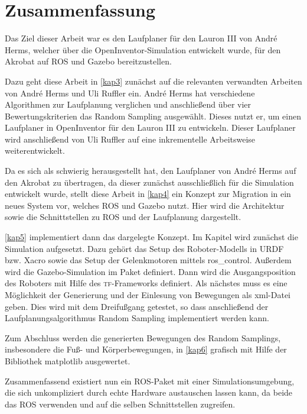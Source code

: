 \chapter{Zusammenfassung}
\label{kap7}

Das Ziel dieser Arbeit war es den Laufplaner für den Lauron III von André Herms, welcher über die OpenInventor-Simulation entwickelt wurde, für den Akrobat auf \ac{ROS} und Gazebo bereitzustellen.

Dazu geht diese Arbeit in \autoref{kap3} zunächst auf die relevanten verwandten Arbeiten von André Herms und Uli Ruffler ein. André Herms hat verschiedene Algorithmen zur Laufplanung verglichen und anschließend über vier Bewertungskriterien das Random Sampling ausgewählt. Dieses nutzt er, um einen Laufplaner in OpenInventor für den Lauron III zu entwickeln. Dieser Laufplaner wird anschließend von Uli Ruffler auf eine inkrementelle Arbeitsweise weiterentwickelt.

Da es sich als schwierig herausgestellt hat, den Laufplaner von André Herms auf den Akrobat zu übertragen, da dieser zunächst ausschließlich für die Simulation entwickelt wurde, stellt diese Arbeit in \autoref{kap4} ein Konzept zur Migration in ein neues System vor, welches \ac{ROS} und Gazebo nutzt. Hier wird die Architektur sowie die Schnittstellen zu \ac{ROS} und der Laufplanung dargestellt.

\autoref{kap5} implementiert dann das dargelegte Konzept. Im Kapitel wird zunächst die Simulation aufgesetzt. Dazu gehört das Setup des Roboter-Modells in \ac{URDF} bzw. \ac{Xacro} sowie das Setup der Gelenkmotoren mittels ros\_control. Außerdem wird die Gazebo-Simulation im Paket definiert. Dann wird die Ausgangsposition des Roboters mit Hilfe des \textsc{tf}-Frameworks definiert. Als nächstes muss es eine Möglichkeit der Generierung und der Einlesung von Bewegungen als xml-Datei geben. Dies wird mit dem Dreifußgang getestet, so dass anschließend der Laufplanungsalgorithmus Random Sampling implementiert werden kann.

Zum Abschluss werden die generierten Bewegungen des Random Samplings, insbesondere die Fuß- und Körperbewegungen, in \autoref{kap6} grafisch mit Hilfe der Bibliothek matplotlib ausgewertet.

Zusammenfassend existiert nun ein \ac{ROS}-Paket mit einer Simulationsumgebung, die sich unkompliziert durch echte Hardware austauschen lassen kann, da beide das \ac{ROS} verwenden und auf die selben Schnittstellen zugreifen.